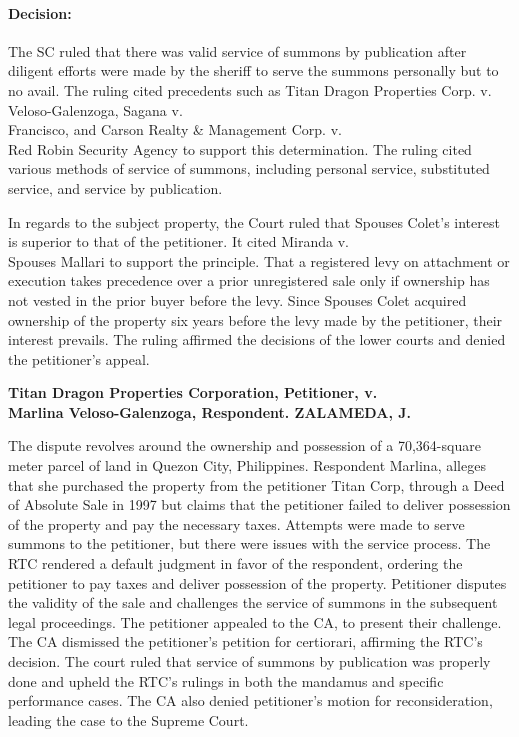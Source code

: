 \documentclass[
12pt,
oneside,
onehalfspacing,
headsepline
]{DigestCollection}
\begin{document}
\paragraph{Decision:}
\label{919d0f60-09fd-11ef-932c-63c852f65e48}


The SC ruled that there was valid service of summons by publication after diligent efforts were made by the sheriff to serve the summons personally but to no avail. The ruling cited precedents such as Titan Dragon Properties Corp. v. \\Veloso-Galenzoga, Sagana v. \\Francisco, and Carson Realty \& Management Corp. v. \\Red Robin Security Agency to support this determination. The ruling cited various methods of service of summons, including personal service, substituted service, and service by publication.

In regards to the subject property, the Court ruled that Spouses Colet's interest is superior to that of the petitioner. It cited Miranda v. \\Spouses Mallari to support the principle. That a registered levy on attachment or execution takes precedence over a prior unregistered sale only if ownership has not vested in the prior buyer before the levy. Since Spouses Colet acquired ownership of the property six years before the levy made by the petitioner, their interest prevails. The ruling affirmed the decisions of the lower courts and denied the petitioner's appeal.

\label{cea96590-0a0f-11ef-932c-63c852f65e48}


\noindent\textbf{Titan Dragon Properties Corporation, Petitioner, v. \\Marlina Veloso-Galenzoga, Respondent. ZALAMEDA, J. }

The dispute revolves around the ownership and possession of a 70,364-square meter parcel of land in Quezon City, Philippines. Respondent Marlina, alleges that she purchased the property from the petitioner Titan Corp, through a Deed of Absolute Sale in 1997 but claims that the petitioner failed to deliver possession of the property and pay the necessary taxes. Attempts were made to serve summons to the petitioner, but there were issues with the service process. The RTC rendered a default judgment in favor of the respondent, ordering the petitioner to pay taxes and deliver possession of the property. Petitioner disputes the validity of the sale and challenges the service of summons in the subsequent legal proceedings. The petitioner appealed to the CA, to present their challenge. The CA dismissed the petitioner's petition for certiorari, affirming the RTC's decision. The court ruled that service of summons by publication was properly done and upheld the RTC's rulings in both the mandamus and specific performance cases. The CA also denied petitioner's motion for reconsideration, leading the case to the Supreme Court.
\end{document}
